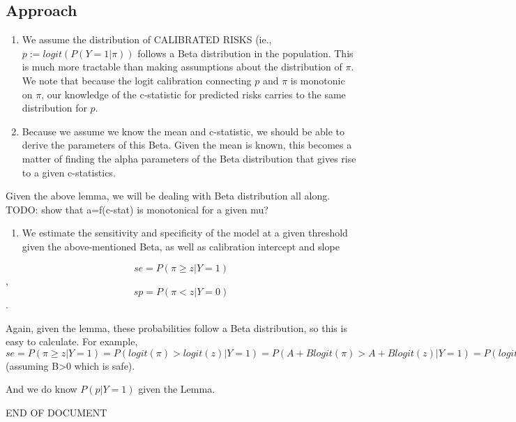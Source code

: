 \documentclass[
]{article}
\providecommand{\tightlist}{%
  \setlength{\itemsep}{0pt}\setlength{\parskip}{0pt}}
\begin{document}
\hypertarget{approach}{%
\subsection{Approach}\label{approach}}

\begin{enumerate}
\def\labelenumi{\arabic{enumi}.}
\item
  We assume the distribution of CALIBRATED RISKS (ie.,
  \(p:= logit(P(Y=1 | \pi))\) follows a Beta distribution in the
  population. This is much more tractable than making assumptions about
  the distribution of \(\pi\). We note that because the logit
  calibration connecting \(p\) and \(\pi\) is monotonic on \(\pi\), our
  knowledge of the c-statistic for predicted risks carries to the same
  distribution for \(p\).
\item
  Because we assume we know the mean and c-statistic, we should be able
  to derive the parameters of this Beta. Given the mean is known, this
  becomes a matter of finding the alpha parameters of the Beta
  distribution that gives rise to a given c-statistics.
\end{enumerate}

Given the above lemma, we will be dealing with Beta distribution all
along. TODO: show that a=f(c-stat) is monotonical for a given mu?

\begin{enumerate}
\def\labelenumi{\arabic{enumi}.}
\setcounter{enumi}{2}
\tightlist
\item
  We estimate the sensitivity and specificity of the model at a given
  threshold given the above-mentioned Beta, as well as calibration
  intercept and slope
\end{enumerate}

\[ se=P(\pi \ge z | Y=1)  \], \[ sp=P(\pi \lt z | Y=0)  \].

Again, given the lemma, these probabilities follow a Beta distribution,
so this is easy to calculate. For example,
\(se=P(\pi \ge z | Y=1)=P(logit(\pi)>logit(z) | Y=1)=P(A+Blogit(\pi)>A+Blogit(z) | Y=1)=P(logit(p)>A+Blogit(z) | Y=1) = P(p>expit(A+Blogit(z)) | Y=1)\)
(assuming B\textgreater0 which is safe).

And we do know \(P(p | Y=1)\) given the Lemma.

END OF DOCUMENT
\end{document}
